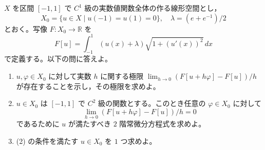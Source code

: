 \documentclass[12pt]{jlreq}
\begin{document}
$X$ を区間 $[-1,1]$ で $C^1$ 級の実数値関数全体の作る線形空間とし，
\[
  X_0 = \{ u \in X \mid u(-1) = u(1) = 0 \},\quad \lambda = (e + e^{-1})/2
\]
とおく。写像 $F : X_0 \to \mathbb{R}$ を
\[
  F[u] = \int_{-1}^1 (u(x) + \lambda)\sqrt{1 + (u'(x))^2} \, dx
\]
で定義する。以下の問に答えよ。

\begin{enumerate}
  \item $u, \varphi \in X_0$ に対して実数 $h$ に関する極限 $\lim_{h \to 0} (F[u + h\varphi] - F[u])/h$ が存在することを示し，その極限を求めよ。
  \item $u \in X_0$ は $[-1,1]$ で $C^2$ 級の関数とする。このとき任意の $\varphi \in X_0$ に対して
  \[
    \lim_{h \to 0} (F[u + h\varphi] - F[u])/h = 0
  \]
  であるために $u$ が満たすべき $2$ 階常微分方程式を求めよ。
  \item (2) の条件を満たす $u \in X_0$ を $1$ つ求めよ。
\end{enumerate}
\end{document}
